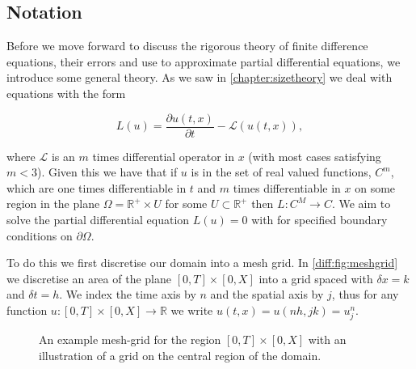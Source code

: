 \documentclass[../main.tex]{subfiles}
\begin{document}
  \subsection{Notation}
  Before we move forward to discuss the rigorous theory of finite difference equations, their errors and use to approximate partial differential equations, we introduce some general theory. As we saw in \autoref{chapter:sizetheory} we deal with equations with the form

  \begin{equation} \label{diff:eq:pdeprob}
    L(u) = \frac{\partial u(t, x)}{\partial t} - \mathcal{L}(u(t, x)),
  \end{equation}

  where $\mathcal{L}$ is an $m$ times differential operator in $x$ (with most cases satisfying $m < 3$). Given this we have that if $u$ is in the set of real valued functions, $C^m$, which are one times differentiable in $t$ and $m$ times differentiable in $x$ on some region in the plane $\Omega = \mathbb{R}^+ \times U$ for some $U \subset \mathbb{R}^+$ then $L : C^M \to C$. We aim to solve the partial differential equation $L(u) = 0$ with for specified boundary conditions on $\partial \Omega$.

  To do this we first discretise our domain into a mesh grid. In \autoref{diff:fig:meshgrid} we discretise an area of the plane $[0, T] \times [0, X]$ into a grid spaced with $\delta x = k$ and $\delta t = h$. We index the time axis by $n$ and the spatial axis by $j$, thus for any function $u : [0, T] \times [0, X] \to \mathbb{R}$ we write $u(t, x) = u(n h, j k) = u^n_j$.

  \begin{figure}[hbt]
    \centering

    \caption{An example mesh-grid for the region $[0, T] \times [0, X]$ with an illustration of a grid on the central region of the domain. \label{diff:fig:meshgrid}}
  \end{figure}
\end{document}
